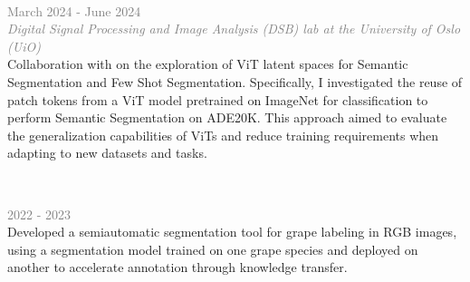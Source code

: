 

    
    


\\
\begin{small} \color{black}
\textcolor{gray}{March 2024 - June 2024\\ 
\textit{Digital Signal Processing and Image Analysis (DSB) lab at the University of Oslo (UiO)}} \\
Collaboration with  on the exploration of ViT latent spaces for Semantic Segmentation and Few Shot Segmentation. Specifically, I investigated the reuse of patch tokens from a ViT model pretrained on ImageNet for classification to perform Semantic Segmentation on ADE20K. This approach aimed to evaluate the generalization capabilities of ViTs and reduce training requirements when adapting to new datasets and tasks.
\end{small}


\vspace{3mm}
\\
\begin{small} \color{black}
\textcolor{gray}{2022 - 2023}\\ 
Developed a semiautomatic segmentation tool for grape labeling in RGB images, using a segmentation model trained on one grape species and deployed on another to accelerate annotation through knowledge transfer.\\
\end{small}



